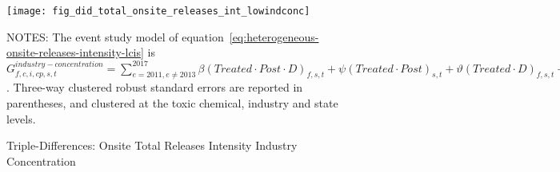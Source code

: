 \begin{figure}[H]
    \centering
    \texttt{[image: fig\_did\_total\_onsite\_releases\_int\_lowindconc]}
    \caption{Triple-Differences: Onsite Total Releases Intensity Industry Concentration}
    \label{fig:heterogeneous-onsite-releases-intensity-lcis}
    \begin{minipage}{18cm}
        \vspace{0.05in}
        NOTES: The event study model of equation~\ref{eq:heterogeneous-onsite-releases-intensity-lcis} is $G_{f,c,i,cp,s,t}^{industry-concentration} = \sum_{{e = 2011},{e \neq 2013}}^{2017} \beta (Treated \cdot Post \cdot D)_{f,s,t} + \psi (Treated \cdot Post)_{s,t} + \vartheta (Treated \cdot D)_{f,s,t} + \mu (Post \cdot D)_{f,s,t} + \tau Treated_{s,t} + \rho D_{f,s,t} + \alpha Post_{t} + \delta X_{v,c,t-1} + \omega F_{f,t} + \lambda_{t} + \gamma_{f} + \phi_{cp} + \zeta_{c} + \eta_{c,t} + \varepsilon_{f,cp,c,t}$. Three-way clustered robust standard errors are reported in parentheses, and clustered at the toxic chemical, industry and state levels.
    \end{minipage}
\end{figure}
